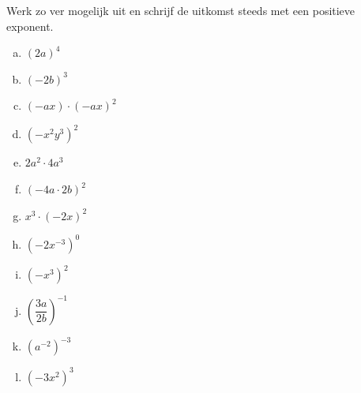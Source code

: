 \documentclass[12pt,twoside]{article}
\begin{document}
\begin{oefening}
Werk zo ver mogelijk uit en schrijf de uitkomst steeds met een positieve exponent.
\begin{multicols}{4}
  \begin{enumerate}[(a)]
    \itemsep1em
    \item $\left(2a\right)^{4}$
    \item $\left(-2b\right)^{3}$
    \item $\left(-ax\right)\cdot\left(-ax\right)^{2}$
    \item $\left(-x^2y^3\right)^{2}$
    \item $2a^2\cdot 4a^3$
    \item $\left(-4a\cdot 2b\right)^2$
    \item $x^3\cdot\left(-2x\right)^2$
    \item $\left(-2x^{-3}\right)^0$
    \item $\left(-x^3\right)^2$
    \item $\left(\dfrac{3a}{2b}\right)^{-1}$
    \item $\left(a^{-2}\right)^{-3}$
    \item $\left(-3x^2\right)^3$
  \end{enumerate}
\end{multicols}
\end{oefening}
\end{document}
